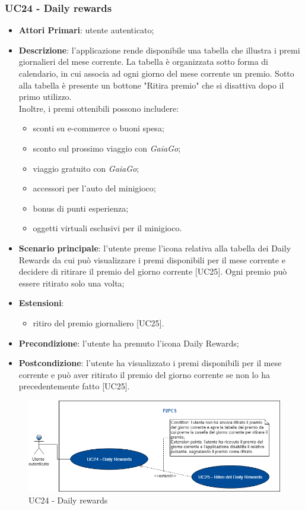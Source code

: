 
\subsubsection{UC24 - Daily rewards}
\begin{itemize}
	\item \textbf{Attori Primari}: utente autenticato;
	\item \textbf{Descrizione}: l'applicazione rende disponibile una tabella che illustra i premi giornalieri del mese corrente. La tabella è organizzata sotto forma di calendario, in cui associa ad ogni giorno del mese corrente un premio.
	Sotto alla tabella è presente un bottone "Ritira premio" che si disattiva dopo il primo utilizzo.\\
	Inoltre, i premi ottenibili possono includere:
	\begin{itemize}
		\item sconti su e-commerce o buoni spesa;
		\item sconto sul prossimo viaggio con \textit{GaiaGo};
		\item viaggio gratuito con \textit{GaiaGo};
		\item accessori per l'auto del minigioco;
		\item bonus di punti esperienza;
		\item oggetti virtuali esclusivi per il minigioco.
	\end{itemize}
	\item \textbf{Scenario principale}: l'utente preme l'icona relativa alla tabella dei Daily Rewards da cui può visualizzare i premi disponibili per il mese corrente e decidere di ritirare il premio del giorno corrente [UC25].
	Ogni premio può essere ritirato solo una volta;
	\item \textbf{Estensioni}: 
		\begin{itemize}
			\item ritiro del premio giornaliero [UC25].
		\end{itemize}
	\item \textbf{Precondizione}: l'utente ha premuto l'icona Daily Rewards;
	\item \textbf{Postcondizione}: l'utente ha visualizzato i premi disponibili per il mese corrente e può aver ritirato il premio del giorno corrente se non lo ha precedentemente fatto [UC25]. 
\end{itemize} 
\begin{figure}[h]
	\includegraphics[width=13.2cm]{res/images/UC24Daily.png}
	\centering
	\caption{UC24 - Daily rewards}
\end{figure}
